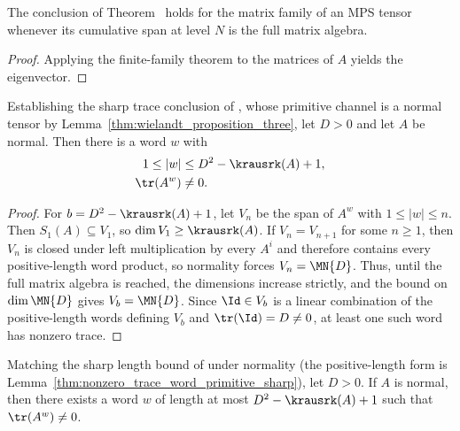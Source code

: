 \begin{lemma}
    \label{thm:mps_eigenvector_from_full_cumulative_span}
    \leanok
    The conclusion of
    Theorem~\cite[``Eigenvector extraction from a full cumulative span'']{QICLean2026Blueprint} holds for the
    matrix family of an MPS tensor whenever its cumulative span at level $N$
    is the full matrix algebra.
\end{lemma}

\begin{proof}\leanok
    Applying the finite-family theorem to the matrices of $A$ yields the
    eigenvector.
\end{proof}

\begin{lemma}%
    \label{thm:nonzero_trace_word_primitive_sharp}
    \leanok
    Establishing the sharp trace conclusion of
    \cite[Lemma~1]{Sanz2010Quantum}, whose primitive channel is a normal
    tensor by Lemma~\ref{thm:wielandt_proposition_three}, let $D>0$ and let
    $A$ be normal. Then there is a word $w$
    with
    \begin{align}
        1\le|w|  & \le D^2-\krausrk(A)+1,
        \notag                            \\
        \tr(A^w) & \neq0.
        \notag
    \end{align}
\end{lemma}

\begin{proof}\leanok
    For $b=D^2-\krausrk(A)+1$, let
    $V_n$ be the span of $A^w$ with $1\le|w|\le n$. Then
    $S_1(A)\subseteq V_1$, so $\dim V_1\ge\krausrk(A)$. If
    $V_n=V_{n+1}$ for some $n\ge1$, then $V_n$ is closed under left
    multiplication by every $A^i$ and therefore contains every positive-length
    word product, so normality forces $V_n=\MN{D}$. Thus, until the full matrix
    algebra is reached, the dimensions increase strictly, and the bound on
    $\dim\MN{D}$ gives $V_b=\MN{D}$. Since $\Id\in V_b$ is a linear
    combination of the positive-length words defining $V_b$ and
    $\tr(\Id)=D\neq0$, at least one such word has nonzero trace.
\end{proof}

\begin{lemma}%
    \label{thm:nonzero_trace_word_sharp}
    \leanok
    Matching the sharp length bound of \cite[Lemma~1]{Sanz2010Quantum} under
    normality (the positive-length form is
    Lemma~\ref{thm:nonzero_trace_word_primitive_sharp}), let $D>0$. If $A$ is
    normal, then there exists a word $w$ of length at most $D^2-\krausrk(A)+1$
    such that $\tr(A^w)\neq0$.
\end{lemma}

